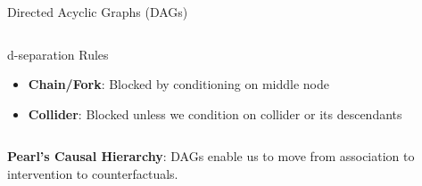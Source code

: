 \documentclass[aspectratio=169,11pt]{beamer}
\begin{document}
\begin{frame}{Directed Acyclic Graphs (DAGs)}
\begin{columns}
\begin{column}{0.4\textwidth}
\begin{figure}
\end{figure}

\begin{block}{d-separation Rules}
\begin{itemize}
\item \textbf{Chain/Fork}: Blocked by conditioning on middle node
\item \textbf{Collider}: Blocked unless we condition on collider or its descendants
\end{itemize}
\end{block}
\end{column}
\end{columns}

\textbf{Pearl's Causal Hierarchy}: DAGs enable us to move from association to intervention to counterfactuals.
\end{frame}
\end{document}
